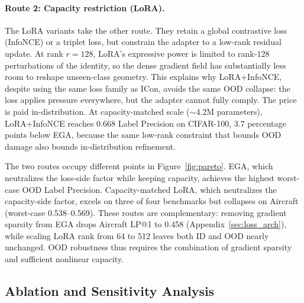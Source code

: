 \documentclass{article}
\begin{document}
\paragraph{Route 2: Capacity restriction (LoRA).}
The LoRA variants take the other route.
They retain a global contrastive loss (InfoNCE) or a triplet loss, but constrain the adapter to a low-rank residual update.
At rank $r=128$, LoRA's expressive power is limited to rank-$128$ perturbations of the identity, so the dense gradient field has substantially less room to reshape unseen-class geometry.
This explains why LoRA+InfoNCE, despite using the same loss family as ICon, avoids the same OOD collapse: the loss applies pressure everywhere, but the adapter cannot fully comply.
The price is paid in-distribution.
At capacity-matched scale ($\sim$4.2M parameters), LoRA+InfoNCE reaches $0.668$ Label Precision on CIFAR-100, $3.7$ percentage points below EGA, because the same low-rank constraint that bounds OOD damage also bounds in-distribution refinement.

The two routes occupy different points in Figure~\ref{fig:pareto}.
EGA, which neutralizes the loss-side factor while keeping capacity, achieves the highest worst-case OOD Label Precision.
Capacity-matched LoRA, which neutralizes the capacity-side factor, excels on three of four benchmarks but collapses on Aircraft (worst-case 0.538--0.569).
These routes are complementary: removing gradient sparsity from EGA drops Aircraft LP@1 to 0.458 (Appendix~\ref{sec:loss_arch}), while scaling LoRA rank from 64 to 512 leaves both ID and OOD nearly unchanged.
OOD robustness thus requires the combination of gradient sparsity and sufficient nonlinear capacity.

\subsection{Ablation and Sensitivity Analysis}
\label{sec:ablation}
\end{document}
